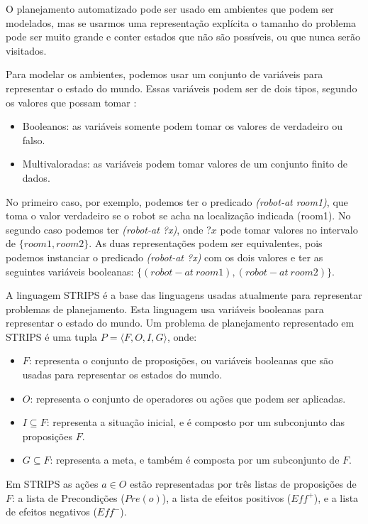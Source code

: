 \documentclass[12pt,a4paper]{article}
\begin{document}
O planejamento automatizado pode ser usado em ambientes que podem ser modelados, mas se usarmos uma representação explícita o tamanho do problema pode ser muito grande e conter estados que não são possíveis, ou que nunca serão visitados.

Para modelar os ambientes, podemos usar um conjunto de variáveis para representar o estado do mundo. 
Essas variáveis podem ser de dois tipos, segundo os valores que possam tomar \cite{geffner2013concise}:

\begin{itemize}
\item Booleanos: as variáveis somente podem tomar os valores de verdadeiro ou falso.
\item Multivaloradas: as variáveis podem tomar valores de um conjunto finito de dados.
\end{itemize}

No primeiro caso, por exemplo, podemos ter o predicado \textit{(robot-at room1)}, que toma o valor verdadeiro se o robot se acha na localização indicada (room1).
No segundo caso podemos ter \textit{(robot-at ?x)}, onde $?x$ pode tomar valores no intervalo de $\{ room1, room2 \}$.
As duas representações podem ser equivalentes, pois podemos instanciar o predicado \textit{(robot-at ?x)} com os dois valores e ter as seguintes variáveis booleanas: $\{ (robot-at~room1), (robot-at~room2) \}$.

A linguagem STRIPS é a base das linguagens usadas atualmente para representar problemas de planejamento.
Esta linguagem usa variáveis booleanas para representar o estado do mundo.
Um problema de planejamento representado em STRIPS é uma tupla $P=\langle F,O,I,G \rangle$, onde:

\begin{itemize}
\item $F$: representa o conjunto de proposições, ou variáveis booleanas que são usadas para representar os estados do mundo.
\item $O$: representa o conjunto de operadores ou ações que podem ser aplicadas.
\item $I\subseteq F$: representa a situação inicial, e é composto por um subconjunto das proposições $F$.
\item $G \subseteq F$: representa a meta, e também é composta por um subconjunto de $F$.
\end{itemize}

Em STRIPS as ações $a \in O$ estão representadas por três listas de proposições de $F$: a lista de Precondições ($Pre(o)$), a lista de efeitos positivos ($Eff^+$), e a lista de efeitos negativos ($Eff^-$).
\end{document}
